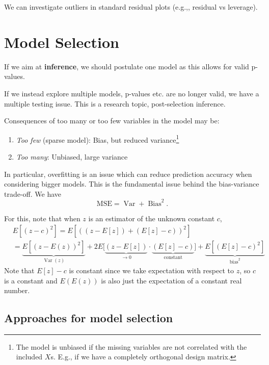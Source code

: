 \documentclass[11pt, %
	oneside, %
	english, %
	onehalfspacing, %
	]{article} %
\numberwithin{equation}{section}
\begin{document}
We can investigate outliers in standard residual plots (e.g.,, residual vs leverage).


\section{Model Selection}

If we aim at \textbf{inference}, we should postulate one model as this allows for valid p-values.

If we instead explore multiple models, p-values etc. are no longer valid, we have a multiple testing issue. This is a research topic, post-selection inference.

Consequences of too many or too few variables in the model may be:
\begin{enumerate}
    \item \emph{Too few} (sparse model): Bias, but reduced variance\footnote{The model is unbiased if the missing variables are not correlated with the included $X$s. E.g., if we have a completely orthogonal design matrix.}
    \item \emph{Too many}: Unbiased, large variance
\end{enumerate}

In particular, overfitting is an issue which can reduce prediction accuracy when considering bigger models. This is the fundamental issue behind the bias-variance trade-off. We have
\begin{equation*}
    \text{MSE} = \operatorname{Var} + \operatorname{Bias}^2.
\end{equation*}


For this, note that when $z$ is an estimator of the unknown constant $c$,
$$
\begin{aligned}
    & E\left[(z-c)^2\right]=E\left[((z-E[z])+(E[z]-c))^2\right] \\
    & =\underbrace{E\left[(z-E(z))^2\right]}_{\operatorname{Var}(z)}+2 E\Big[\underbrace{(z-E[z])}_{\to 0} \cdot \underbrace{(E[z]-c)}_{\text { constant }}\Big]  +\underbrace{E\left[(E[z]-c)^2\right]}_{\text{bias}^2}
\end{aligned}
$$
Note that $E[z]-c$ is constant since we take expectation with respect to $z$, so $c$ is a constant and $E(E(z))$ is also just the expectation of a constant real number.

\subsection{Approaches for model selection}
\end{document}
